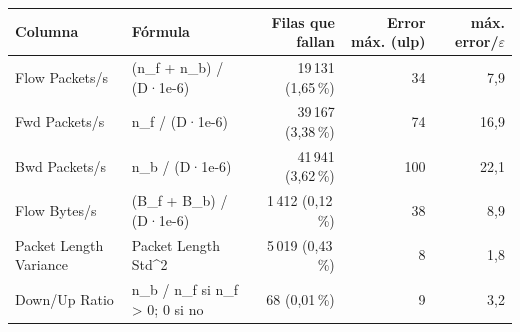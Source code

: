 \begin{tabular}{@{}>{\raggedright\arraybackslash}p{3cm}>{\raggedright\arraybackslash}p{4.6cm}rrr@{}}
\toprule
Columna & Fórmula & Filas que fallan & Error máx. (ulp) & máx. error/$\varepsilon$ \\
\midrule
Flow Packets/s & (n\_f + n\_b) / (D·1e-6) & 19\,131 (1{,}65\,\%) & 34 & 7{,}9 \\
Fwd Packets/s & n\_f / (D·1e-6) & 39\,167 (3{,}38\,\%) & 74 & 16{,}9 \\
Bwd Packets/s & n\_b / (D·1e-6) & 41\,941 (3{,}62\,\%) & 100 & 22{,}1 \\
Flow Bytes/s & (B\_f + B\_b) / (D·1e-6) & 1\,412 (0{,}12\,\%) & 38 & 8{,}9 \\
Packet Length Variance & Packet Length Std\^{}2 & 5\,019 (0{,}43\,\%) & 8 & 1{,}8 \\
Down/Up Ratio & n\_b / n\_f si n\_f > 0; 0 si no & 68 (0{,}01\,\%) & 9 & 3{,}2 \\
\bottomrule
\end{tabular}
